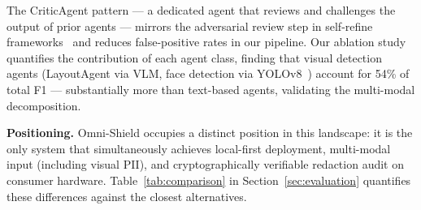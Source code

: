 The CriticAgent pattern --- a dedicated agent that
reviews and challenges the output of prior agents ---
mirrors the adversarial review step in self-refine
frameworks~\cite{madaan2023selfrefine} and reduces
false-positive rates in our pipeline.
Our ablation study quantifies the contribution of
each agent class, finding that visual detection
agents (LayoutAgent via VLM, face detection via
YOLOv8~\cite{redmon2016yolo}) account for 54\% of
total F1 --- substantially more than text-based
agents, validating the multi-modal decomposition.

\vspace{6pt}
\noindent\textbf{Positioning.}
Omni-Shield occupies a distinct position in this
landscape: it is the only system that simultaneously
achieves local-first deployment, multi-modal input
(including visual PII), and cryptographically
verifiable redaction audit on consumer hardware.
Table~\ref{tab:comparison} in Section~\ref{sec:evaluation}
quantifies these differences against the closest
alternatives.
